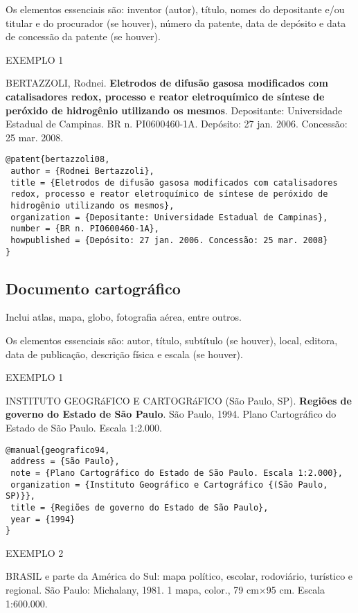 Os elementos essenciais são: inventor (autor), título, nomes do depositante e/ou titular e do procurador (se houver), número da patente, data de depósito e data de concessão da patente (se houver).

EXEMPLO 1 

BERTAZZOLI, Rodnei. \textbf{Eletrodos de difusão gasosa modificados com catalisadores redox, processo e reator eletroquímico de síntese de peróxido de hidrogênio utilizando os mesmos}. Depositante: Universidade Estadual de Campinas. BR n. PI0600460-1A. Depósito: 27 jan. 2006. Concessão: 25 mar. 2008. 

\begin{verbatim}
@patent{bertazzoli08,
 author = {Rodnei Bertazzoli},
 title = {Eletrodos de difusão gasosa modificados com catalisadores 
 redox, processo e reator eletroquímico de síntese de peróxido de 
 hidrogênio utilizando os mesmos},
 organization = {Depositante: Universidade Estadual de Campinas},
 number = {BR n. PI0600460-1A},
 howpublished = {Depósito: 27 jan. 2006. Concessão: 25 mar. 2008}
}
\end{verbatim}

\subsection{Documento cartográfico}

Inclui atlas, mapa, globo, fotografia aérea, entre outros.

Os elementos essenciais são: autor, título, subtítulo (se houver), local, editora, data de publicação, descrição física e escala (se houver). 

EXEMPLO 1 

INSTITUTO GEOGRáFICO E CARTOGRáFICO (São Paulo, SP). \textbf{Regiões de governo do Estado de São Paulo}. São Paulo, 1994. Plano Cartográfico do Estado de São Paulo. Escala 1:2.000.

\begin{verbatim}
@manual{geografico94,
 address = {São Paulo},
 note = {Plano Cartográfico do Estado de São Paulo. Escala 1:2.000},
 organization = {Instituto Geográfico e Cartográfico {(São Paulo, SP)}},
 title = {Regiões de governo do Estado de São Paulo},
 year = {1994}
}
\end{verbatim}

EXEMPLO 2

BRASIL e parte da América do Sul: mapa político, escolar, rodoviário, turístico e regional. São Paulo: Michalany, 1981. 1 mapa, color., 79 cm$\times$95 cm. Escala 1:600.000.

